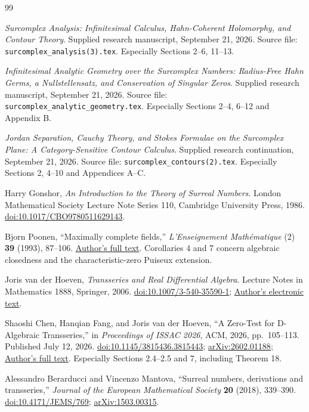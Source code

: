 \documentclass[11pt,letterpaper]{article}
\theoremstyle{definition}\newtheorem{definition}[theorem]{Definition}
\theoremstyle{remark}\newtheorem{remark}[theorem]{Remark}
\newcommand{\code}[1]{\texttt{#1}}
\numberwithin{equation}{section}\setcounter{tocdepth}{2}
\begin{document}
\begin{thebibliography}{99}
\emph{Surcomplex Analysis: Infinitesimal Calculus, Hahn-Coherent Holomorphy, and Contour Theory}.
Supplied research manuscript, September 21, 2026.
Source file: \code{surcomplex\_analysis(3).tex}. Especially Sections 2--6, 11--13.

\emph{Infinitesimal Analytic Geometry over the Surcomplex Numbers: Radius-Free Hahn Germs, a Nullstellensatz, and Conservation of Singular Zeros}.
Supplied research manuscript, September 21, 2026.
Source file: \code{surcomplex\_analytic\_geometry.tex}. Especially Sections 2--4, 6--12 and Appendix B.

\emph{Jordan Separation, Cauchy Theory, and Stokes Formulae on the Surcomplex Plane: A Category-Sensitive Contour Calculus}.
Supplied research continuation, September 21, 2026.
Source file: \code{surcomplex\_contours(2).tex}. Especially Sections 2, 4--10 and Appendices A--C.

Harry Gonshor, \emph{An Introduction to the Theory of Surreal Numbers}.
London Mathematical Society Lecture Note Series 110, Cambridge University Press, 1986.
\href{https://doi.org/10.1017/CBO9780511629143}{doi:10.1017/CBO9780511629143}.

Bjorn Poonen, ``Maximally complete fields,''
\emph{L'Enseignement Math\'ematique} (2) \textbf{39} (1993), 87--106.
\href{https://math.mit.edu/~poonen/papers/amsval.pdf}{Author's full text}.
Corollaries 4 and 7 concern algebraic closedness and the characteristic-zero Puiseux extension.

Joris van der Hoeven, \emph{Transseries and Real Differential Algebra}.
Lecture Notes in Mathematics 1888, Springer, 2006.
\href{https://doi.org/10.1007/3-540-35590-1}{doi:10.1007/3-540-35590-1};
\href{https://www.texmacs.org/joris/ln/ln.html}{Author's electronic text}.

Shaoshi Chen, Hanqian Fang, and Joris van der Hoeven,
``A Zero-Test for D-Algebraic Transseries,''
in \emph{Proceedings of ISSAC 2026}, ACM, 2026, pp.~105--113.
Published July 12, 2026.
\href{https://doi.org/10.1145/3815436.3815443}{doi:10.1145/3815436.3815443};
\href{https://arxiv.org/abs/2602.01188}{arXiv:2602.01188};
\href{https://www.texmacs.org/joris/zttr/zttr.html}{Author's full text}.
Especially Sections 2.4--2.5 and 7, including Theorem 18.

Alessandro Berarducci and Vincenzo Mantova,
``Surreal numbers, derivations and transseries,''
\emph{Journal of the European Mathematical Society} \textbf{20} (2018), 339--390.
\href{https://doi.org/10.4171/JEMS/769}{doi:10.4171/JEMS/769};
\href{https://arxiv.org/abs/1503.00315}{arXiv:1503.00315}.


\end{thebibliography}
\end{document}
